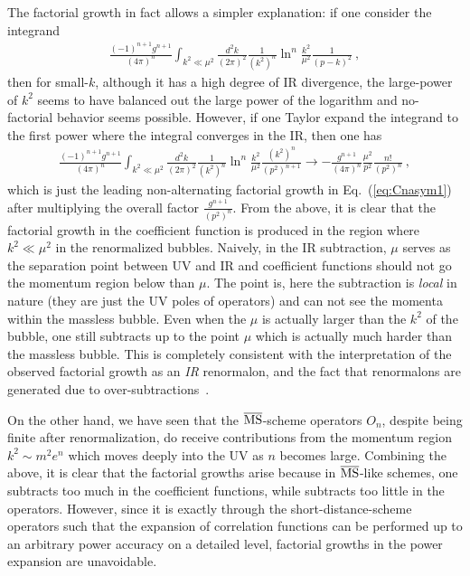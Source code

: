 \documentclass[a4paper,11pt]{article}
\begin{document}
\begin{enumerate}
   The factorial growth in fact allows a simpler explanation: if one consider the integrand
   \begin{align}
   \frac{(-1)^{n+1}g^{n+1}}{(4\pi)^n}\int_{k^2 \ll \mu^2}\frac{d^2k}{(2\pi)^2}\frac{1}{(k^2)^n}\ln^{n}\frac{k^2}{\mu^2}\frac{1}{(p-k)^2} \ ,
   \end{align}
   then for small-$k$, although it has a high degree of IR divergence, the large-power of $k^2$ seems to have balanced out the large power of the logarithm and no-factorial behavior seems possible. However, if one Taylor expand the integrand to the first power where the integral converges in the IR, then one has
\begin{align}
\frac{(-1)^{n+1}g^{n+1}}{(4\pi)^n}\int_{k^2 \ll \mu^2}\frac{d^2k}{(2\pi)^2}\frac{1}{(k^2)^n}\ln^{n}\frac{k^2}{\mu^2}\frac{(k^2)^n}{(p^2)^{n+1}} \rightarrow -\frac{g^{n+1}}{(4\pi)^n}\frac{\mu^2}{p^2}\frac{n!}{(p^2)^n} \ ,
\end{align}
which is just the leading non-alternating factorial growth in Eq.~(\ref{eq:Cnasym1}) after multiplying the overall factor $\frac{g^{n+1}}{(p^2)^n}$. From the above, it is clear that the factorial growth in the coefficient function is produced in the region where $k^2\ll \mu^2$ in the renormalized bubbles. Naively, in the IR subtraction, $\mu$ serves as the separation point between UV and IR and coefficient functions should not go the momentum region below than $\mu$. The point is, here the subtraction is {\it local} in nature (they are just the UV poles of operators) and can not see the momenta within the massless bubble. Even when the $\mu$ is actually larger than the $k^2$ of the bubble, one still subtracts up to the point $\mu$ which is actually much harder than the massless bubble. This is completely consistent with the interpretation of the observed factorial growth as an {\it IR} renormalon, and the fact that renormalons are generated due to over-subtractions~\cite{Feldman:1985th,Rivasseau:2014zpm}. 

On the other hand, we have seen that the $\overline{\rm MS}$-scheme operators $O_n$, despite being finite after renormalization, do receive contributions from the momentum region $k^2\sim m^2e^{n}$ which moves deeply into the UV as $n$ becomes large. Combining the above, it is clear that the factorial growths arise because in $\overline{\rm MS}$-like schemes, one subtracts too much in the coefficient functions, while subtracts too little in the operators. However, since it is exactly through the short-distance-scheme operators such that the expansion of correlation functions can be performed up to an arbitrary power accuracy on a detailed level, factorial growths in the power expansion are unavoidable. 




\end{enumerate}
\end{document}
